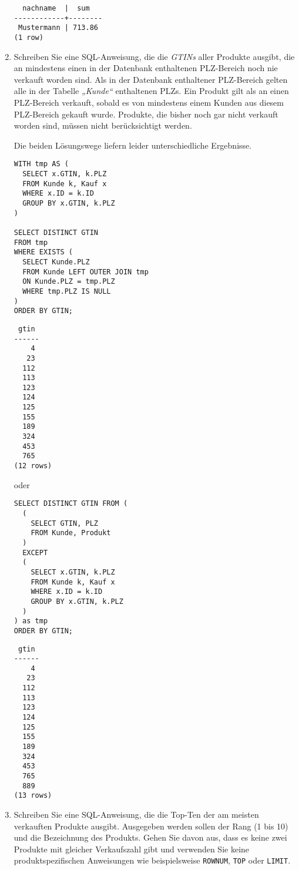 \documentclass{bschlangaul-aufgabe}
\begin{document}
\begin{enumerate}
\begin{liAntwort}
\begin{verbatim}
  nachname  |  sum
------------+--------
 Mustermann | 713.86
(1 row)
\end{verbatim}
\end{liAntwort}


\item Schreiben Sie eine SQL-Anweisung, die die \emph{GTINs} aller
Produkte ausgibt, die an mindestens einen in der Datenbank enthaltenen
PLZ-Bereich noch nie verkauft worden sind. Als in der Datenbank
enthaltener PLZ-Bereich gelten alle in der Tabelle \emph{„Kunde“}
enthaltenen PLZs. Ein Produkt gilt als an einen PLZ-Bereich verkauft,
sobald es von mindestens einem Kunden aus diesem PLZ-Bereich gekauft
wurde. Produkte, die bisher noch gar nicht verkauft worden sind, müssen
nicht berücksichtigt werden.

\begin{liAntwort}
Die beiden Lösungswege liefern leider unterschiedliche Ergebnisse.
\begin{verbatim}
WITH tmp AS (
  SELECT x.GTIN, k.PLZ
  FROM Kunde k, Kauf x
  WHERE x.ID = k.ID
  GROUP BY x.GTIN, k.PLZ
)

SELECT DISTINCT GTIN
FROM tmp
WHERE EXISTS (
  SELECT Kunde.PLZ
  FROM Kunde LEFT OUTER JOIN tmp
  ON Kunde.PLZ = tmp.PLZ
  WHERE tmp.PLZ IS NULL
)
ORDER BY GTIN;
\end{verbatim}

\begin{verbatim}
 gtin
------
    4
   23
  112
  113
  123
  124
  125
  155
  189
  324
  453
  765
(12 rows)
\end{verbatim}

oder

\begin{verbatim}
SELECT DISTINCT GTIN FROM (
  (
    SELECT GTIN, PLZ
    FROM Kunde, Produkt
  )
  EXCEPT
  (
    SELECT x.GTIN, k.PLZ
    FROM Kunde k, Kauf x
    WHERE x.ID = k.ID
    GROUP BY x.GTIN, k.PLZ
  )
) as tmp
ORDER BY GTIN;
\end{verbatim}

\begin{verbatim}
 gtin
------
    4
   23
  112
  113
  123
  124
  125
  155
  189
  324
  453
  765
  889
(13 rows)
\end{verbatim}
\end{liAntwort}


\item Schreiben Sie eine SQL-Anweisung, die die Top-Ten der am meisten
verkauften Produkte ausgibt. Ausgegeben werden sollen der Rang (1 bis
10) und die Bezeichnung des Produkts. Gehen Sie davon aus, dass es keine
zwei Produkte mit gleicher Verkaufszahl gibt und verwenden Sie keine
produktspezifischen Anweisungen wie beispielsweise \verb|ROWNUM|,
\verb|TOP| oder \verb|LIMIT|.


\end{enumerate}
\end{document}
